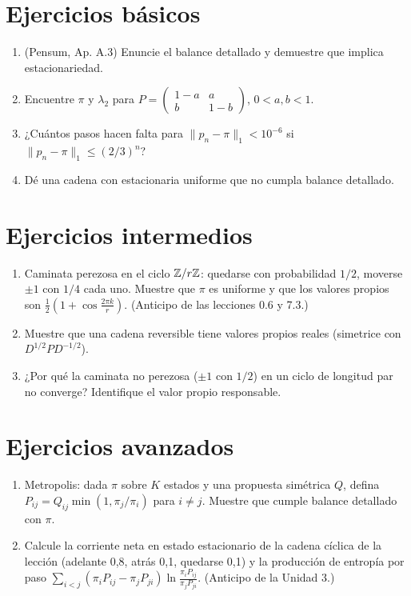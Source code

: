 \documentclass[11pt,a4paper]{article}
\begin{document}

\section{Ejercicios básicos}
\begin{enumerate}[label=\textbf{B\arabic*.}]
\item (Pensum, Ap. A.3) Enuncie el balance detallado y demuestre que implica estacionariedad.
\item Encuentre $\pi$ y $\lambda_2$ para $P=\begin{pmatrix}1-a&a\\b&1-b\end{pmatrix}$, $0<a,b<1$.
\item ¿Cuántos pasos hacen falta para $\|p_n-\pi\|_1<10^{-6}$ si $\|p_n-\pi\|_1\le(2/3)^n$?
\item Dé una cadena con estacionaria uniforme que no cumpla balance detallado.
\end{enumerate}

\section{Ejercicios intermedios}
\begin{enumerate}[label=\textbf{I\arabic*.}]
\item Caminata perezosa en el ciclo $\mathbb{Z}/r\mathbb{Z}$: quedarse con probabilidad $1/2$, moverse $\pm1$ con $1/4$ cada uno. Muestre que $\pi$ es uniforme y que los valores propios son $\frac12(1+\cos\frac{2\pi k}{r})$. (Anticipo de las lecciones 0.6 y 7.3.)
\item Muestre que una cadena reversible tiene valores propios reales (simetrice con $D^{1/2}PD^{-1/2}$).
\item ¿Por qué la caminata no perezosa ($\pm1$ con $1/2$) en un ciclo de longitud par no converge? Identifique el valor propio responsable.
\end{enumerate}

\section{Ejercicios avanzados}
\begin{enumerate}[label=\textbf{A\arabic*.}]
\item Metropolis: dada $\pi$ sobre $K$ estados y una propuesta simétrica $Q$, defina $P_{ij}=Q_{ij}\min(1,\pi_j/\pi_i)$ para $i\neq j$. Muestre que cumple balance detallado con $\pi$.
\item Calcule la corriente neta en estado estacionario de la cadena cíclica de la lección (adelante 0,8, atrás 0,1, quedarse 0,1) y la producción de entropía por paso $\sum_{i<j}(\pi_iP_{ij}-\pi_jP_{ji})\ln\frac{\pi_iP_{ij}}{\pi_jP_{ji}}$. (Anticipo de la Unidad 3.)
\end{enumerate}
\end{document}
